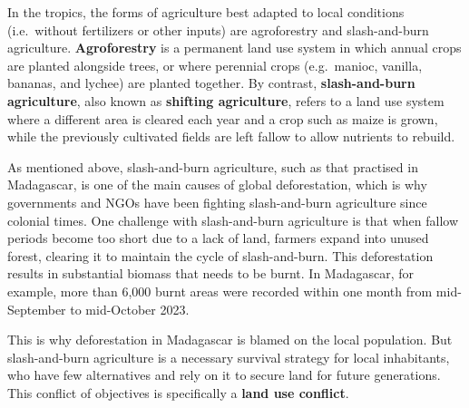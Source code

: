 \documentclass[
  a4paper,
  DIV=11,
  numbers=noendperiod,
  oneside,
  openany]{scrreprt}
\begin{document}
\begin{tcolorbox}[enhanced jigsaw, arc=.35mm, bottomrule=.15mm, bottomtitle=1mm, breakable, colback=white, colbacktitle=quarto-callout-tip-color!10!white, colframe=quarto-callout-tip-color-frame, coltitle=black, left=2mm, leftrule=.75mm, opacityback=0, opacitybacktitle=0.6, rightrule=.15mm, title={Land use change in the tropics: the case of Madagascar}, titlerule=0mm, toprule=.15mm, toptitle=1mm]

In the tropics, the forms of agriculture best adapted to local
conditions (i.e.~without fertilizers or other inputs) are agroforestry
and slash-and-burn agriculture. \textbf{Agroforestry} is a permanent
land use system in which annual crops are planted alongside trees, or
where perennial crops (e.g.~manioc, vanilla, bananas, and lychee) are
planted together. By contrast, \textbf{slash-and-burn agriculture}, also
known as \textbf{shifting agriculture}, refers to a land use system
where a different area is cleared each year and a crop such as maize is
grown, while the previously cultivated fields are left fallow to allow
nutrients to rebuild.

As mentioned above, slash-and-burn agriculture, such as that practised
in Madagascar, is one of the main causes of global deforestation, which
is why governments and NGOs have been fighting slash-and-burn
agriculture since colonial times. One challenge with slash-and-burn
agriculture is that when fallow periods become too short due to a lack
of land, farmers expand into unused forest, clearing it to maintain the
cycle of slash-and-burn. This deforestation results in substantial
biomass that needs to be burnt. In Madagascar, for example, more than
6,000 burnt areas were recorded within one month from mid-September to
mid-October 2023.

This is why deforestation in Madagascar is blamed on the local
population. But slash-and-burn agriculture is a necessary survival
strategy for local inhabitants, who have few alternatives and rely on it
to secure land for future generations. This conflict of objectives is
specifically a \textbf{land use conflict}.

\end{tcolorbox}
\end{document}
